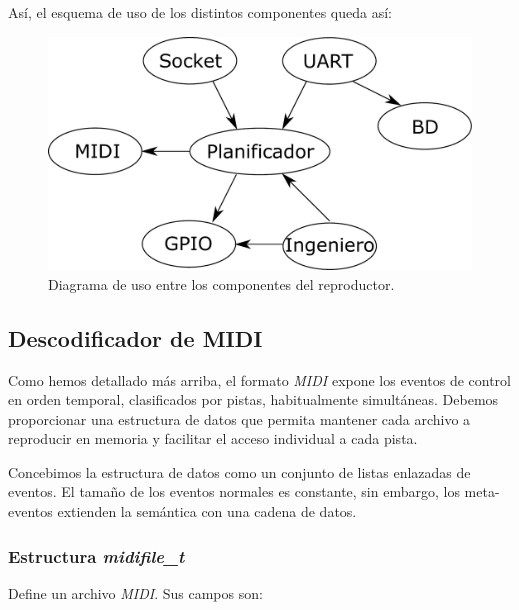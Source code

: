Así, el esquema de uso de los distintos componentes queda así:

\smallskip

\begin{figure}[H]
	\noindent \begin{centering}
		\includegraphics[width=\linewidth/2]{capitulo4/daemon}
		\par\end{centering}
	\smallskip
	\caption{\label{fig:daemon} Diagrama de uso entre los componentes del reproductor.}
\end{figure} 

\smallskip

\subsection{Descodificador de MIDI}
\label{subsec:daemon_midi}

Como hemos detallado más arriba, el formato \textit{MIDI} expone los eventos de control en orden temporal, clasificados por pistas, habitualmente simultáneas. Debemos proporcionar una estructura de datos que permita mantener cada archivo a reproducir en memoria y facilitar el acceso individual a cada pista.

Concebimos la estructura de datos como un conjunto de listas enlazadas de eventos. El tamaño de los eventos normales es constante, sin embargo, los meta-eventos extienden la semántica con una cadena de datos.

\subsubsection{Estructura \textit{midifile\_t}}

Define un archivo \textit{MIDI}. Sus campos son:

